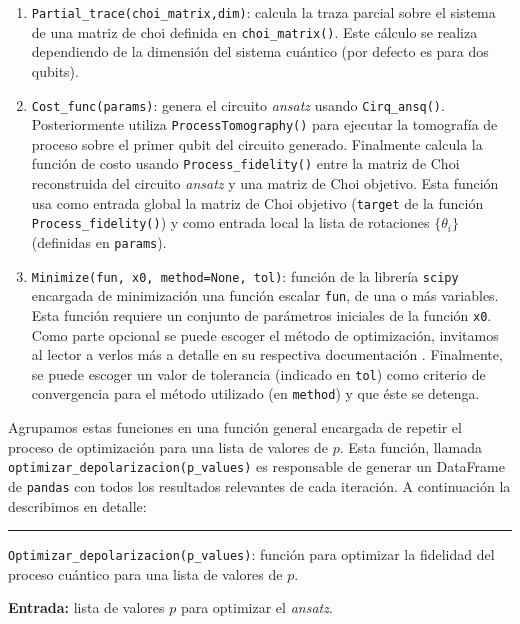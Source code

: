 \documentclass[letterpaper,12pt]{thesisECFM}
\theoremstyle{plain}
\theoremstyle{definition}
\theoremstyle{remark}
\newcommand{\1}{\mathbb{1}}
\begin{document}
\begin{enumerate}
    \item \texttt{Partial\_trace(choi\_matrix,dim)}: calcula la traza parcial
sobre el sistema de una matriz de choi definida en \texttt{choi\_matrix()}.
Este cálculo se realiza dependiendo de la dimensión del sistema cuántico (por
defecto es para dos qubits).
    
    \item \texttt{Cost\_func(params)}: genera el circuito \textit{ansatz} usando
\texttt{Cirq\_ansq()}. Posteriormente utiliza \texttt{ProcessTomography()} para
ejecutar la tomografía de proceso sobre el primer qubit del circuito generado.
Finalmente calcula la función de costo usando \texttt{Process\_fidelity()}
entre la matriz de Choi reconstruida del circuito \textit{ansatz} y una matriz de Choi
objetivo. Esta función usa como entrada global la matriz de Choi objetivo
(\texttt{target} de la función \texttt{Process\_fidelity()}) y como entrada
local la lista de rotaciones $\{\theta_i\}$ (definidas en  \texttt{params}).

    \item \texttt{Minimize(fun, x0, method=None, tol)}: función de la librería
\texttt{scipy} encargada de minimización una función escalar \texttt{fun}, de
una o más variables. Esta función requiere un conjunto de parámetros iniciales
de la función \texttt{x0}. Como parte opcional se puede escoger el método de
optimización, invitamos al lector a verlos más a detalle en su respectiva
documentación \cite{scipy}. Finalmente, se puede escoger un valor de tolerancia
(indicado en \texttt{tol})  como criterio de convergencia para el método
utilizado (en \texttt{method}) y que éste se detenga.
    
\end{enumerate}

Agrupamos estas funciones en una función general encargada de repetir el
proceso de optimización para una lista de valores de $p$. Esta función, llamada
\texttt{optimizar\_depolarizacion(p\_values)} es responsable de generar un
DataFrame de \texttt{pandas} con todos los resultados relevantes de cada
iteración. A continuación la describimos en detalle:

\noindent\rule{\textwidth}{1mm}
\texttt{Optimizar\_depolarizacion(p\_values)}: función para optimizar la
fidelidad del proceso cuántico para una lista de valores de $p$. \newline

\noindent\textbf{Entrada:} lista de valores $p$ para optimizar el \textit{ansatz}.
\end{document}
